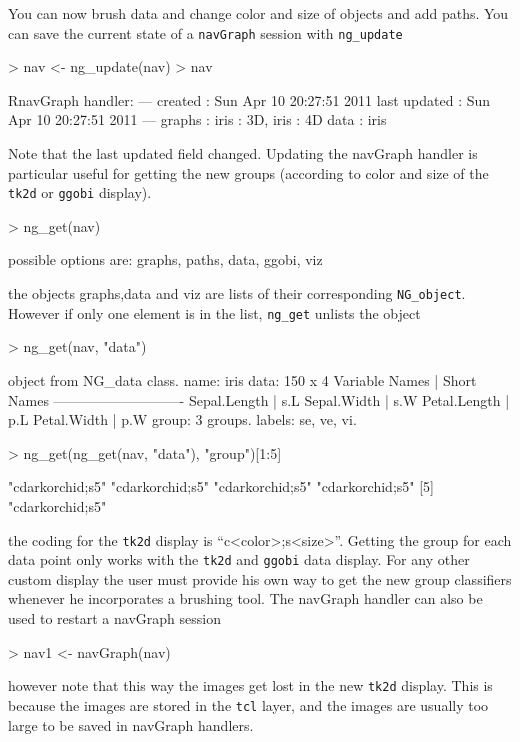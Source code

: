\documentclass[12pt,oneside,titlepage,letter]{article}
\begin{document}
You can now brush data and change color and size of objects and add paths. You can save the current state of a \texttt{navGraph} session with \texttt{ng\_update}
\begin{Schunk}
\begin{Sinput}
> nav <- ng_update(nav)
> nav
\end{Sinput}
\begin{Soutput}
RnavGraph handler:
---
created       : Sun Apr 10 20:27:51 2011 
last updated  : Sun Apr 10 20:27:51 2011 
---
graphs        : iris : 3D, iris : 4D 
data          : iris 
\end{Soutput}
\end{Schunk}
Note that the last updated field changed. Updating the navGraph handler is particular useful for getting the new groups (according to color and size of the \texttt{tk2d} or \texttt{ggobi} display).
\begin{Schunk}
\begin{Sinput}
> ng_get(nav)
\end{Sinput}
\begin{Soutput}
possible options are: graphs, paths, data, ggobi, viz
\end{Soutput}
\end{Schunk}
the objects graphs,data and viz are lists of their corresponding \texttt{NG\_object}. However if only one element is in the list, \texttt{ng\_get} unlists the object
\begin{Schunk}
\begin{Sinput}
> ng_get(nav, "data")
\end{Sinput}
\begin{Soutput}
object from NG_data class.
  name: iris 
  data: 150 x 4 
    Variable Names | Short Names
    ----------------------------
    Sepal.Length   | s.L
    Sepal.Width    | s.W
    Petal.Length   | p.L
    Petal.Width    | p.W
  group:  3 groups.
  labels: se, ve, vi. 
\end{Soutput}
\begin{Sinput}
> ng_get(ng_get(nav, "data"), "group")[1:5]
\end{Sinput}
\begin{Soutput}
[1] "cdarkorchid;s5" "cdarkorchid;s5" "cdarkorchid;s5" "cdarkorchid;s5"
[5] "cdarkorchid;s5"
\end{Soutput}
\end{Schunk}
the coding for the \texttt{tk2d} display is ``c<color>;s<size>''. Getting the group for each data point only works with the \texttt{tk2d} and \texttt{ggobi} data display. For any other custom display the user must provide his own way to get the new group classifiers whenever he incorporates a brushing tool. The navGraph handler can also be used to restart a navGraph session
\begin{Schunk}
\begin{Sinput}
> nav1 <- navGraph(nav)
\end{Sinput}
\end{Schunk}
however note that this way the images get lost in the new \texttt{tk2d} display. This is because the images are stored in the \texttt{tcl} layer, and the images are usually too large to be saved in navGraph handlers.\\
\end{document}

